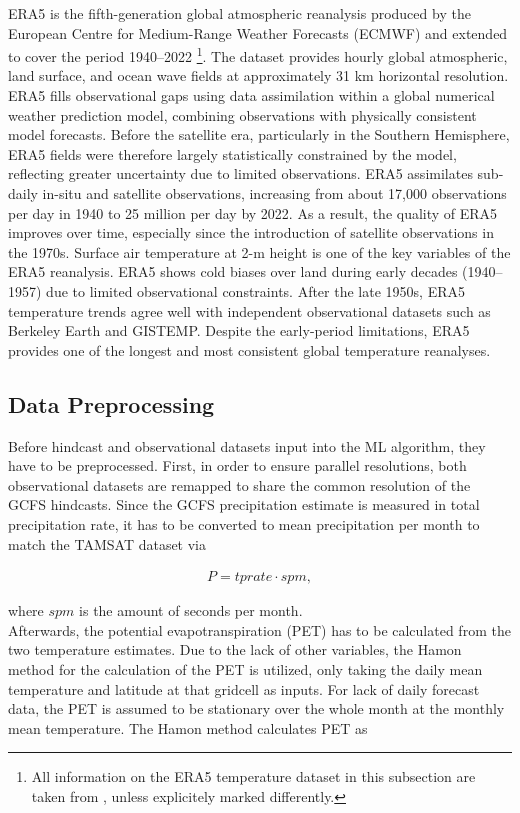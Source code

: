 \documentclass[ba-lentz.tex]{subfile}
\begin{document}
ERA5 is the fifth-generation global atmospheric reanalysis produced by the European Centre for Medium-Range Weather Forecasts (ECMWF) and extended to cover the period 1940–2022 \parencite{soci_era5_2024}\footnote{All information on the ERA5 temperature dataset in this subsection are taken from \parencite{soci_era5_2024}, unless explicitely marked differently.}.
The dataset provides hourly global atmospheric, land surface, and ocean wave fields at approximately 31 km horizontal resolution.
ERA5 fills observational gaps using data assimilation within a global numerical weather prediction model, combining observations with physically consistent model forecasts.
Before the satellite era, particularly in the Southern Hemisphere, ERA5 fields were therefore largely statistically constrained by the model, reflecting greater uncertainty due to limited observations.
ERA5 assimilates sub-daily in-situ and satellite observations, increasing from about 17,000 observations per day in 1940 to 25 million per day by 2022.
As a result, the quality of ERA5 improves over time, especially since the introduction of satellite observations in the 1970s.
Surface air temperature at 2-m height is one of the key variables of the ERA5 reanalysis.
ERA5 shows cold biases over land during early decades (1940–1957) due to limited observational constraints.
After the late 1950s, ERA5 temperature trends agree well with independent observational datasets such as Berkeley Earth and GISTEMP.
Despite the early-period limitations, ERA5 provides one of the longest and most consistent global temperature reanalyses.

\subsection{Data Preprocessing}\label{preprocessing}

Before hindcast and observational datasets input into the ML algorithm, they have to be preprocessed.
First, in order to ensure parallel resolutions, both observational datasets are remapped to share the common resolution of the GCFS hindcasts.
Since the GCFS precipitation estimate is measured in total precipitation rate, it has to be converted to mean precipitation per month to match the TAMSAT dataset via

\begin{align}
    P = tprate \cdot spm ,
\end{align}

where $spm$ is the amount of seconds per month. \\
Afterwards, the potential evapotranspiration (PET) has to be calculated from the two temperature estimates.
Due to the lack of other variables, the Hamon method for the calculation of the PET is utilized, only taking the daily mean temperature and latitude at that gridcell as inputs.
For lack of daily forecast data, the PET is assumed to be stationary over the whole month at the monthly mean temperature.
The Hamon method calculates PET as
\end{document}
